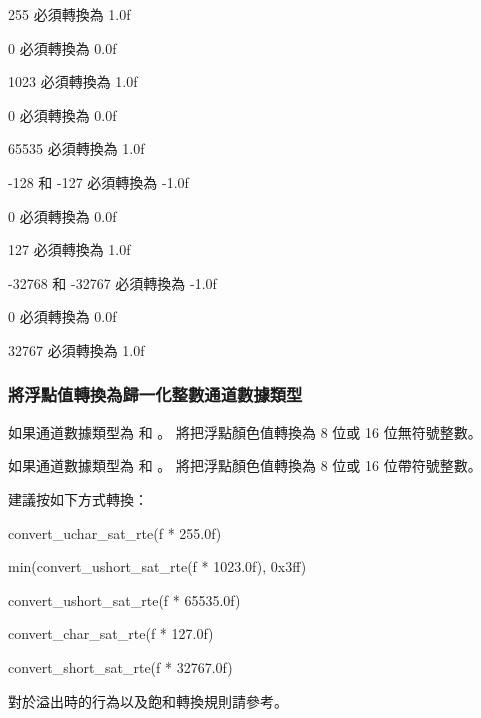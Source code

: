 255 必須轉換為 1.0f
\stopclCmmDesc

0 必須轉換為 0.0f

1023 必須轉換為 1.0f
\stopclCmmDesc

0 必須轉換為 0.0f

65535 必須轉換為 1.0f
\stopclCmmDesc

-128 和 -127 必須轉換為 -1.0f

0 必須轉換為 0.0f

127 必須轉換為 1.0f
\stopclCmmDesc

-32768 和 -32767 必須轉換為 -1.0f

0 必須轉換為 0.0f

32767 必須轉換為 1.0f
\stopclCmmDesc

\subsubsection{將浮點值轉換為歸一化整數通道數據類型}

如果通道數據類型為  和 。
 將把浮點顏色值轉換為 8 位或 16 位無符號整數。

如果通道數據類型為  和 。
 將把浮點顏色值轉換為 8 位或 16 位帶符號整數。

建議按如下方式轉換：

convert_uchar_sat_rte(f * 255.0f)
\stopclCmmDesc

min(convert_ushort_sat_rte(f * 1023.0f), 0x3ff)
\stopclCmmDesc

convert_ushort_sat_rte(f * 65535.0f)
\stopclCmmDesc

convert_char_sat_rte(f * 127.0f)
\stopclCmmDesc

convert_short_sat_rte(f * 32767.0f)
\stopclCmmDesc

對於溢出時的行為以及飽和轉換規則請參考。

